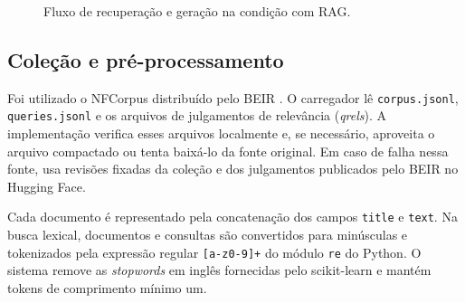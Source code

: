 \documentclass[12pt]{article}
\begin{document}
\begin{figure}[htbp]
\centering
{}
\caption{Fluxo de recuperação e geração na condição com RAG.}
\label{fig:pipeline}
\end{figure}

\subsection{Coleção e pré-processamento}

Foi utilizado o NFCorpus distribuído pelo BEIR \cite{boteva2016,thakur2021}.
O carregador lê \texttt{corpus.jsonl}, \texttt{queries.jsonl} e os arquivos de
julgamentos de relevância (\textit{qrels}). A implementação verifica esses
arquivos localmente e, se necessário, aproveita o arquivo compactado ou tenta
baixá-lo da fonte original. Em caso de falha nessa fonte, usa revisões fixadas
da coleção e dos julgamentos publicados pelo BEIR no Hugging Face.

Cada documento é representado pela concatenação dos campos \texttt{title} e
\texttt{text}. Na busca lexical, documentos e consultas são convertidos para
minúsculas e tokenizados pela expressão regular \texttt{[a-z0-9]+} do módulo
\texttt{re} do Python. O sistema remove as \textit{stopwords} em inglês
fornecidas pelo scikit-learn e mantém tokens de comprimento mínimo um.
\end{document}
